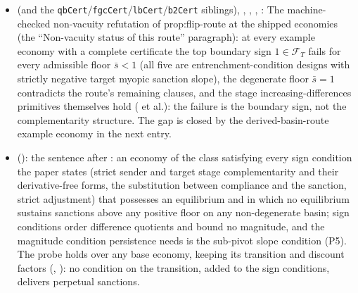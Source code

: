 \begin{itemize}[leftmargin=1.4em,itemsep=1pt]
\item {} (and the \texttt{qbCert}/\texttt{fgcCert}/\texttt{lbCert}/\texttt{b2Cert} siblings), , , , : The machine-checked non-vacuity refutation of prop:flip-route at the shipped economies (the ``Non-vacuity status of this route'' paragraph): at every example economy with a complete certificate the top boundary sign $1\in\mathcal F_T$ fails for every admissible floor $\bar s<1$ (all five are entrenchment-condition designs with strictly negative target myopic sanction slope), the degenerate floor $\bar s=1$ contradicts the route's remaining clauses, and the stage increasing-differences primitives themselves hold ( et al.): the failure is the boundary sign, not the complementarity structure. The gap is closed by the derived-basin-route example economy in the next entry.
\item {} (): the sentence after : an economy of the class satisfying every sign condition the paper states (strict sender and target stage complementarity and their derivative-free forms, the substitution between compliance and the sanction, strict adjustment) that possesses an equilibrium and in which no equilibrium sustains sanctions above any positive floor on any non-degenerate basin; sign conditions order difference quotients and bound no magnitude, and the magnitude condition persistence needs is the sub-pivot slope condition (P5). The probe holds over any base economy, keeping its transition and discount factors (, ): no condition on the transition, added to the sign conditions, delivers perpetual sanctions.

\end{itemize}
